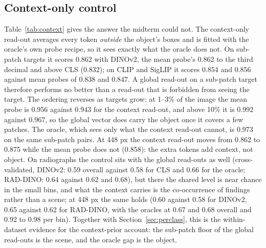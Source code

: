 \documentclass[10pt,letterpaper,twocolumn]{article}
\begin{document}
\subsection{Context-only control}
\label{sec:context}
Table~\ref{tab:context} gives the answer the midterm could not. The context-only read-out
averages every token \emph{outside} the object's boxes and is fitted with the oracle's own
probe recipe, so it sees exactly what the oracle does not. On sub-patch targets it scores
0.862 with DINOv2, the mean probe's 0.862 to the third decimal and above CLS (0.832); on
CLIP and SigLIP it scores 0.854 and 0.856 against mean probes of 0.838 and 0.847. A global
read-out on a sub-patch target therefore performs no better than a read-out that is
forbidden from seeing the target. The ordering reverses as targets grow: at 1--3\% of the
image the mean probe is 0.956 against 0.943 for the context read-out, and above 10\% it is
0.992 against 0.967, so the global vector does carry the object once it covers a few
patches. The oracle, which sees only what the context read-out cannot, is 0.973 on the same
sub-patch pairs. At 448 px the context read-out moves from 0.862 to 0.875 while the mean
probe does not (0.858): the extra tokens add context, not object. On radiographs the control
sits with the global read-outs as well (cross-validated, DINOv2: 0.59 overall against 0.58
for CLS and 0.66 for the oracle; RAD-DINO: 0.64 against 0.62 and 0.68), but there the
shared level is near chance in the small bins, and what the context carries is the
co-occurrence of findings rather than a scene; at 448 px the same holds (0.60 against 0.58
for DINOv2, 0.65 against 0.62 for RAD-DINO, with the oracles at 0.67 and 0.68 overall and
0.92 to 0.98 per bin). Together with Section~\ref{sec:perclass},
this is the within-dataset evidence for the context-prior account: the sub-patch floor of
the global read-outs is the scene, and the oracle gap is the object.
\end{document}
